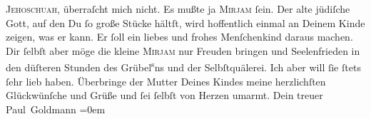 \begin{ledgroupsized}[t]{13cm}
                  \textsc{Jehoschuah}, überraſcht mich nicht. Es mußte ja \textsc{Mirjam} ſein.\pend
           \pstart
           Der alte jüdiſche Gott, auf den Du ſo große Stücke hältſt,  wird hoffentlich einmal an Deinem Kinde zeigen, was er kann. Er ſoll
               ein {\pb}liebes und frohes Menſchenkind daraus machen. Dir ſelbſt aber möge
               die kleine \textsc{Mirjam}{ } nur Freuden bringen und Seelenfrieden in den düſteren Stunden des Grübel\substVorne{}\textsuperscript{s}\substDazwischen{}n\substHinten{}s und der Selbſtquälerei.\pend
           \pstart
           Ich \strikeout{\textcolor{gray}{×}\-\textcolor{gray}{×}\-\textcolor{gray}{×}\-\textcolor{gray}{×}} aber will ſie ſtets ſehr lieb haben.\pend
           \pstart
           Überbringe der Mutter Deines
                  Kindes meine herzlichſten
               Glückwünſche und Grüße und ſei ſelbſt von Herzen umarmt.\pend
           \pstart
           Dein treuer{\\[\baselineskip]}\spacefill\mbox{Paul Goldmann}\pend
           \leftskip=0em{}
         
         \endnumbering{}\end{ledgroupsized}  \newcommand{\dateiname}{L02823}\newcommand{\titel}{Paul Goldmann an Arthur Schnitzler, 13. 9. 1897}\newcommand{\editorInnen}{Martin Anton Müller und Laura Untner}
      